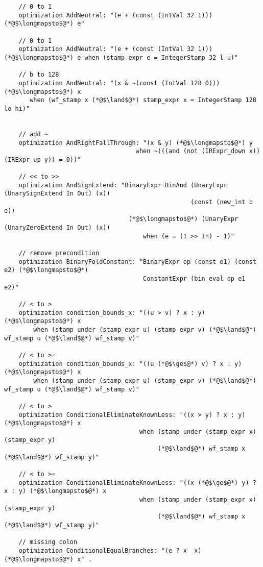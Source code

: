 \begin{appendices}
\begin{lstlisting}
    // 0 to 1
    optimization AddNeutral: "(e + (const (IntVal 32 1))) (*@$\longmapsto$@*) e" 
    
    // 0 to 1
    optimization AddNeutral: "(e + (const (IntVal 32 1))) (*@$\longmapsto$@*) e when (stamp_expr e = IntegerStamp 32 l u)"
    
    // b to 128
    optimization AndNeutral: "(x & ~(const (IntVal 128 0))) (*@$\longmapsto$@*) x 
       when (wf_stamp x (*@$\land$@*) stamp_expr x = IntegerStamp 128 lo hi)"
    
    
    // add ~
    optimization AndRightFallThrough: "(x & y) (*@$\longmapsto$@*) y
                                    when ~(((and (not (IRExpr_down x)) (IRExpr_up y)) = 0))"

    // << to >>
    optimization AndSignExtend: "BinaryExpr BinAnd (UnaryExpr (UnarySignExtend In Out) (x)) 
                                                   (const (new_int b e))
                                  (*@$\longmapsto$@*) (UnaryExpr (UnaryZeroExtend In Out) (x))
                                      when (e = (1 >> In) - 1)"

    // remove precondition
    optimization BinaryFoldConstant: "BinaryExpr op (const e1) (const e2) (*@$\longmapsto$@*)
                                      ConstantExpr (bin_eval op e1 e2)" 

    // < to >
    optimization condition_bounds_x: "((u > v) ? x : y) (*@$\longmapsto$@*) x 
        when (stamp_under (stamp_expr u) (stamp_expr v) (*@$\land$@*) wf_stamp u (*@$\land$@*) wf_stamp v)" 

    // < to >=
    optimization condition_bounds_x: "((u (*@$\ge$@*) v) ? x : y) (*@$\longmapsto$@*) x 
        when (stamp_under (stamp_expr u) (stamp_expr v) (*@$\land$@*) wf_stamp u (*@$\land$@*) wf_stamp v)" 

    // < to >
    optimization ConditionalEliminateKnownLess: "((x > y) ? x : y) (*@$\longmapsto$@*) x 
                                     when (stamp_under (stamp_expr x) (stamp_expr y)
                                          (*@$\land$@*) wf_stamp x (*@$\land$@*) wf_stamp y)" 

    // < to >=
    optimization ConditionalEliminateKnownLess: "((x (*@$\ge$@*) y) ? x : y) (*@$\longmapsto$@*) x 
                                     when (stamp_under (stamp_expr x) (stamp_expr y)
                                          (*@$\land$@*) wf_stamp x (*@$\land$@*) wf_stamp y)"

    // missing colon
    optimization ConditionalEqualBranches: "(e ? x  x) (*@$\longmapsto$@*) x" . 
    

\end{lstlisting}
\end{appendices}
